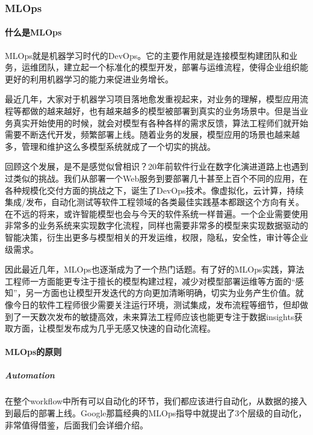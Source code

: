 \documentclass[letterpaper,11pt,english]{sphinxmanual}
\begin{document}
\subsubsection{MLOps}
\label{\detokenize{chapter_AI_dive/MLOps:mlops}}\label{\detokenize{chapter_AI_dive/MLOps::doc}}

\paragraph{什么是MLOps}
\label{\detokenize{chapter_AI_dive/MLOps:id1}}
MLOps就是机器学习时代的DevOps。它的主要作用就是连接模型构建团队和业务，运维团队，建立起一个标准化的模型开发，部署与运维流程，使得企业组织能更好的利用机器学习的能力来促进业务增长。

最近几年，大家对于机器学习项目落地愈发重视起来，对业务的理解，模型应用流程等都做的越来越好，也有越来越多的模型被部署到真实的业务场景中。但是当业务真实开始使用的时候，就会对模型有各种各样的需求反馈，算法工程师们就开始需要不断迭代开发，频繁部署上线。随着业务的发展，模型应用的场景也越来越多，管理和维护这么多模型系统就成了一个切实的挑战。

回顾这个发展，是不是感觉似曾相识？20年前软件行业在数字化演进道路上也遇到过类似的挑战。我们从部署一个Web服务到要部署几十甚至上百个不同的应用，在各种规模化交付方面的挑战之下，诞生了DevOps技术。像虚拟化，云计算，持续集成/发布，自动化测试等软件工程领域的各类最佳实践基本都跟这个方向有关。在不远的将来，或许智能模型也会与今天的软件系统一样普遍。一个企业需要使用非常多的业务系统来实现数字化流程，同样也需要非常多的模型来实现数据驱动的智能决策，衍生出更多与模型相关的开发运维，权限，隐私，安全性，审计等企业级需求。

因此最近几年，MLOps也逐渐成为了一个热门话题。有了好的MLOps实践，算法工程师一方面能更专注于擅长的模型构建过程，减少对模型部署运维等方面的“感知”，另一方面也让模型开发迭代的方向更加清晰明确，切实为业务产生价值。就像今日的软件工程师很少需要关注运行环境，测试集成，发布流程等细节，但却做到了一天数次发布的敏捷高效，未来算法工程师应该也能更专注于数据insights获取方面，让模型发布成为几乎无感又快速的自动化流程。


\paragraph{MLOps的原则}
\label{\detokenize{chapter_AI_dive/MLOps:id2}}

\subparagraph{Automation}
\label{\detokenize{chapter_AI_dive/MLOps:automation}}
在整个workflow中所有可以自动化的环节，我们都应该进行自动化，从数据的接入到最后的部署上线。Google那篇经典的MLOps指导中就提出了3个层级的自动化，非常值得借鉴，后面我们会详细介绍。
\end{document}
